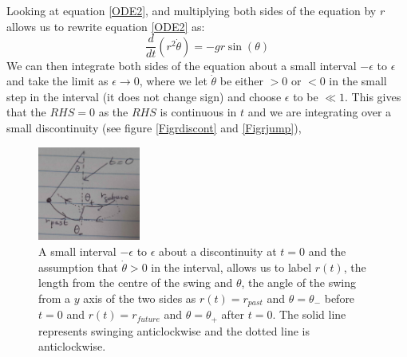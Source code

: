 \documentclass[12pt]{article}
\begin{document}
Looking at equation \ref{ODE2}, and multiplying both sides of the equation by $r$ allows us to rewrite equation \ref{ODE2} as:
\begin{equation}
    \frac{d}{dt}(r^2 \dot{\theta}) = -gr\sin(\theta)
    \label{ODE3}
\end{equation}
We can then integrate both sides of the equation about a small interval $-\epsilon$ to $\epsilon$ and take the limit as $\epsilon \to 0$, where we let $\dot{\theta}$ be either $>0$ or $<0$ in the small step in the interval (it does not change sign) and choose $\epsilon$ to be $\ll 1$. This gives that the $RHS = 0$ as the $RHS$ is continuous in $t$ and we are integrating over a small discontinuity (see figure \ref{Figrdiscont} and \ref{Figrjump}),
\begin{figure}[H]
    \centering
    \includegraphics[width=0.3\textwidth]{Figures/rdiscont.png}
    \caption{A small interval $- \epsilon$ to $\epsilon$ about a discontinuity at $t=0$ and the assumption that $\dot{\theta} >0$ in the interval, allows us to label $r(t)$, the length from the centre of the swing and $\theta$, the angle of the swing from a $y$ axis of the two sides as $r(t) = r_{past}$ and $\theta = \theta_-$ before $t=0$ and $r(t) = r_{future}$ and $\theta = \theta_+$ after $t=0$. The solid line represents swinging anticlockwise and the dotted line is anticlockwise.\label{Figrdiscont}}
    \label{fig1}
\end{figure}
\end{document}
